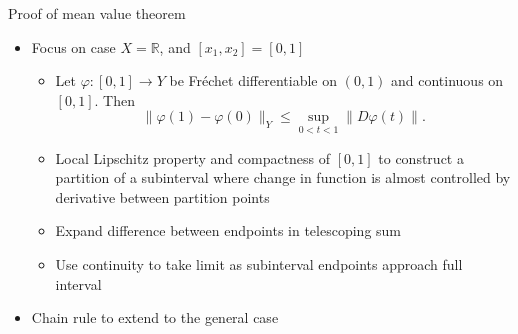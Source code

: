 \documentclass[]{beamer}
\begin{document}
	\begin{frame}{Proof of mean value theorem}
		\begin{itemize}
			\item Focus on case $X = \mathbb{R}$, and $[x_1, x_2] = [0, 1]$
			\begin{itemize}
				\item Let $\varphi : [0,1] \to Y$ be Fréchet differentiable on $(0,1)$ and continuous on $[0,1]$. Then
				\begin{equation*}
					\lVert\varphi(1) - \varphi(0)\rVert_Y \le \sup_{0 < t <1} \lVert D\varphi(t)\rVert.
				\end{equation*}
				\vfill
				\item Local Lipschitz property and compactness of $[0,1]$ to construct a partition of a subinterval where change in function is almost controlled by derivative between partition points
				\vfill
				\item Expand difference between endpoints in telescoping sum
				\vfill
				\item Use continuity to take limit as subinterval endpoints approach full interval
			\end{itemize}
			\vfill
			\item Chain rule to extend to the general case
		\end{itemize}
	\end{frame}
	
\end{document}

